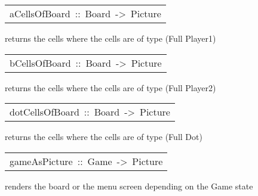 \begin{haddockdesc}
\item[\begin{tabular}{@{}l}
aCellsOfBoard\ ::\ Board\ ->\ Picture
\end{tabular}]\haddockbegindoc
{} returns the cells where the cells are of  type (Full Player1)\par

\end{haddockdesc}
\begin{haddockdesc}
\item[\begin{tabular}{@{}l}
bCellsOfBoard\ ::\ Board\ ->\ Picture
\end{tabular}]\haddockbegindoc
{} returns the cells where the cells are of  type (Full Player2)\par

\end{haddockdesc}
\begin{haddockdesc}
\item[\begin{tabular}{@{}l}
dotCellsOfBoard\ ::\ Board\ ->\ Picture
\end{tabular}]\haddockbegindoc
{} returns the cells where the cells are of  type (Full Dot)\par

\end{haddockdesc}
\begin{haddockdesc}
\item[\begin{tabular}{@{}l}
gameAsPicture\ ::\ Game\ ->\ Picture
\end{tabular}]\haddockbegindoc
{} renders the board or the menu screen depending on the Game state\par

\end{haddockdesc}